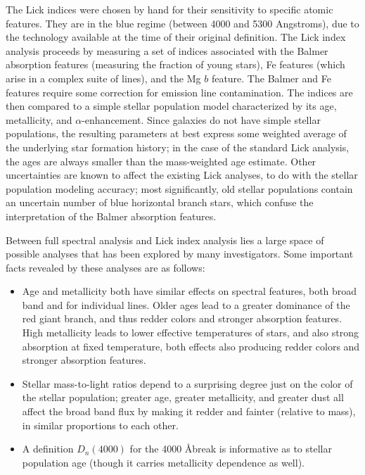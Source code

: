 The Lick indices were chosen by hand for their sensitivity to specific
atomic features. They are in the blue regime (between 4000 and 5300
Angstroms), due to the technology available at the time of their
original definition.  The Lick index analysis proceeds by measuring a
set of indices associated with the Balmer absorption features
(measuring the fraction of young stars), Fe features (which arise in a
complex suite of lines), and the Mg $b$ feature. The Balmer and Fe
features require some correction for emission line contamination. The
indices are then compared to a simple stellar population model
characterized by its age, metallicity, and $\alpha$-enhancement. Since
galaxies do not have simple stellar populations, the resulting
parameters at best express some weighted average of the underlying
star formation history; in the case of the standard Lick analysis, the
ages are always smaller than the mass-weighted age estimate.  Other
uncertainties are known to affect the existing Lick analyses, to do
with the stellar population modeling accuracy; most significantly, old
stellar populations contain an uncertain number of blue horizontal
branch stars, which confuse the interpretation of the Balmer
absorption features.

Between full spectral analysis and Lick index analysis lies a large
space of possible analyses that has been explored by many
investigators. Some important facts revealed by these analyses are as
follows:
\begin{itemize}
\item Age and metallicity both have similar effects on spectral
features, both broad band and for individual lines. Older ages lead to
a greater dominance of the red giant branch, and thus redder colors
and stronger absorption features. High metallicity leads to lower
effective temperatures of stars, and also strong absorption at fixed
temperature, both effects also producing redder colors and stronger
absorption features.
\item Stellar mass-to-light ratios depend to a surprising degree just
on the color of the stellar population; greater age, greater
metallicity, and greater dust all affect the broad band flux by making
it redder and fainter (relative to mass), in similar proportions to
each other.
\item A definition $D_n(4000)$ for the 4000 \AA break is informative
as to stellar population age (though it carries metallicity dependence
as well).  
\end{itemize}


